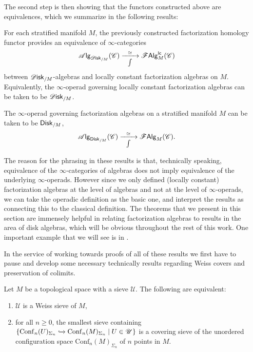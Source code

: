 \documentclass[../text.tex]{subfiles}
\begin{document}
The second step is then showing that the functors constructed above are equivalences, which we summarize in the following results:
%
\begin{theorem}\label{thm:disk_alg=lcfa}
    For each stratified manifold $M$, the previously constructed factorization homology functor provides an equivalence of $\infty$-categories
    \begin{equation}
        \alg{\disk_{/M}} (\catC) \xrightarrow[\int]{\ \ \simeq \ \ } \lcfa_M (\catC)
    \end{equation}
    between $\disk_{/M}$-algebras and locally constant factorization algebras on $M$. Equivalently, the $\infty$-operad governing locally constant factorization algebras can be taken to be $\disk_{/M}$.
\end{theorem}
%
\begin{corollary}\label{cor:disk_alg=falg}
    The $\infty$-operad governing factorization algebras on a stratified manifold $M$ can be taken to be $\disk[r]_{/M}$,
    \begin{equation}
        \alg{\disk[r]_{/M}} (\catC) \xrightarrow[\int]{\ \ \simeq \ \ } \falg_M (\catC).
    \end{equation}
\end{corollary}
%
The reason for the phrasing in these results is that, technically speaking, equivalence of the $\infty$-categories of algebras does not imply equivalence of the underlying $\infty$-operads. However since we only defined (locally constant) factorization algebras at the level of algebras and not at the level of $\infty$-operads, we can take the operadic definition as the basic one, and interpret the results as connecting this to the classical definition. The theorems that we present in this section are immensely helpful in relating factorization algebras to results in the area of disk algebras, which will be obvious throughout the rest of this work. One important example that we will see is in .

In the service of working towards proofs of all of these results we first have to pause and develop some necessary technically results regarding Weiss covers and preservation of colimits.

\begin{lemma}\label{lem:weiss_to_ordinary}
    Let $M$ be a topological space with a sieve $\mathscr{U}$. The following are equivalent:
    \begin{enumerate}
        \item $\mathscr{U}$ is a Weiss sieve of $M$,
        \item for all $n \geq 0$, the smallest sieve containing $\{ \mathrm{Conf}_n(U)_{\Sigma_n} \xhookrightarrow{} \mathrm{Conf}_n(M)_{\Sigma_n} \mid U \in \mathscr{U} \}$ is a covering sieve of the unordered configuration space $\mathrm{Conf}_n(M)_{\Sigma_n}$ of $n$ points in $M$.
    \end{enumerate}
\end{lemma}
\end{document}
